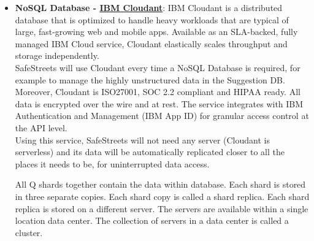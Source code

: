 \begin{itemize}
	\item \textbf{NoSQL Database - \href{https://cloud.ibm.com/catalog/services/cloudant}{IBM Cloudant}}: \hypertarget{cloudant}{} IBM Cloudant is a distributed database that is optimized to handle heavy workloads that are typical of large, fast-growing web and mobile apps. Available as an SLA-backed, fully managed IBM Cloud service, Cloudant elastically scales throughput and storage independently.
	\\SafeStreets will use Cloudant every time a NoSQL Database is required, for example to manage the highly unstructured data in the Suggestion DB.
	Moreover, Cloudant is ISO27001, SOC 2.2 compliant and HIPAA ready. All data is encrypted over the wire and at rest. The service integrates with IBM Authentication and Management (IBM App ID) for granular access control at the API level.
	\\Using this service, SafeStreets will not need any server (Cloudant is serverless) and its data will be automatically replicated closer to all the places it needs to be, for uninterrupted data access.

	All Q shards together contain the data within database. Each shard is stored in three separate copies. Each shard copy is called a shard replica. Each shard replica is stored on a different server. The servers are available within a single location data center. The collection of servers in a data center is called a cluster.
	

\end{itemize}
